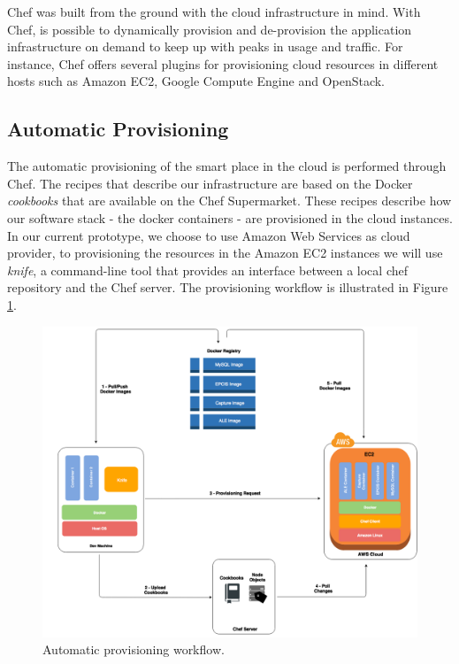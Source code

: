 Chef was built from the ground with the cloud infrastructure in mind. With Chef, is possible to dynamically
provision and de-provision the application infrastructure on demand to keep up with peaks in usage and traffic.
For instance, Chef offers several plugins for provisioning cloud resources in different hosts such as
Amazon EC2, Google Compute Engine and OpenStack.
\subsection{Automatic Provisioning}
\label{sub:automatic_provisioning}
The automatic provisioning of the smart place in the cloud is performed through Chef. The recipes
that describe our infrastructure are based on the Docker \textit{cookbooks} that are available on the Chef
Supermarket. These recipes describe how our software stack - the docker containers - are provisioned
in the cloud instances. In our current prototype, we choose to use Amazon Web Services as cloud provider,
to provisioning the resources in the Amazon EC2 instances we will use \textit{knife}, a
command-line tool that provides an interface between a local chef repository and the Chef server.
The provisioning workflow is illustrated in Figure \ref{fig:automatic_provisioning}.
\begin{figure}[!ht]
  \centering
  \includegraphics[width=.8\textwidth]{images/docker-c4t}
  \caption{Automatic provisioning workflow.}
  \label{fig:automatic_provisioning}
\end{figure}

